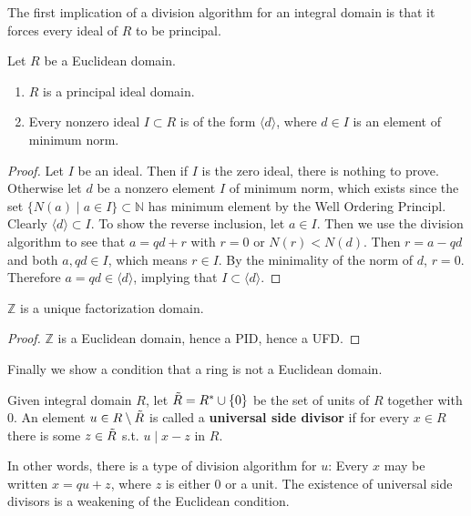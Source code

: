   The first implication of a division algorithm for an integral domain is that it forces every ideal of $R$ to be principal. 

  \begin{theorem}
    Let $R$ be a Euclidean domain. 
    \begin{enumerate}
      \item $R$ is a principal ideal domain. 
      \item Every nonzero ideal $I \subset R$ is of the form $\langle d \rangle$, where $d \in I$ is an element of minimum norm. 
    \end{enumerate}
  \end{theorem}
  \begin{proof}
    Let $I$ be an ideal. Then if $I$ is the zero ideal, there is nothing to prove. Otherwise let $d$ be a nonzero element $I$ of minimum norm, which exists since the set $\{N(a) \mid a \in I \} \subset \mathbb{N}$ has minimum element by the Well Ordering Principl. Clearly $\langle d \rangle \subset I$. To show the reverse inclusion, let $a \in I$. Then we use the division algorithm to see that $a = qd + r$ with $r = 0$ or $N(r) < N(d)$. Then $r = a - qd$ and both $a, qd \in I$, which means $r \in I$. By the minimality of the norm of $d$, $r = 0$. Therefore $a = qd \in \langle d \rangle$, implying that $I \subset \langle d \rangle$. 
  \end{proof}

  \begin{corollary}
    $\mathbb{Z}$ is a unique factorization domain. 
  \end{corollary}
  \begin{proof}
    $\mathbb{Z}$ is a Euclidean domain, hence a PID, hence a UFD. 
  \end{proof}

  Finally we show a condition that a ring is not a Euclidean domain. 

  \begin{definition}
    Given integral domain $R$, let $\Tilde{R} = R^\ast \cup \{0\}$ be the set of units of $R$ together with $0$. An element $u \in R \setminus \Tilde{R}$ is called a \textbf{universal side divisor} if for every $x \in R$ there is some $z \in \Tilde{R}$ s.t. $u \mid x - z$ in $R$. 
  \end{definition}

  In other words, there is a type of division algorithm for $u$: Every $x$ may be written $x = qu + z$, where $z$ is either $0$ or a unit. The existence of universal side divisors is a weakening of the Euclidean condition. 

